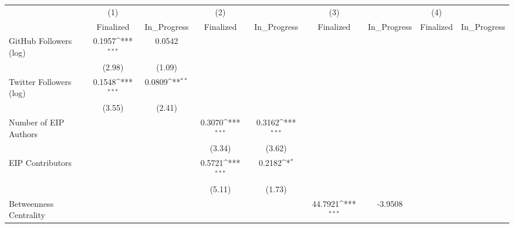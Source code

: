 {
\def\sym#1{\ifmmode^{#1}\else\(^{#1}\)\fi}
\begin{tabular}{l*{8}{c}}
\hline\hline
                                   &\multicolumn{1}{c}{(1)}         &                   &\multicolumn{1}{c}{(2)}         &                   &\multicolumn{1}{c}{(3)}         &                   &\multicolumn{1}{c}{(4)}         &                   \\
                                   & Finalized         &In\_Progress         & Finalized         &In\_Progress         & Finalized         &In\_Progress         & Finalized         &In\_Progress         \\
\hline
GitHub Followers (log)             &    0.1957\sym{***}&    0.0542         &                   &                   &                   &                   &                   &                   \\
                                   &    (2.98)         &    (1.09)         &                   &                   &                   &                   &                   &                   \\
[1em]
Twitter Followers (log)            &    0.1548\sym{***}&    0.0809\sym{**} &                   &                   &                   &                   &                   &                   \\
                                   &    (3.55)         &    (2.41)         &                   &                   &                   &                   &                   &                   \\
[1em]
Number of EIP Authors              &                   &                   &    0.3070\sym{***}&    0.3162\sym{***}&                   &                   &                   &                   \\
                                   &                   &                   &    (3.34)         &    (3.62)         &                   &                   &                   &                   \\
[1em]
EIP Contributors                   &                   &                   &    0.5721\sym{***}&    0.2182\sym{*}  &                   &                   &                   &                   \\
                                   &                   &                   &    (5.11)         &    (1.73)         &                   &                   &                   &                   \\
[1em]
Betweenness Centrality             &                   &                   &                   &                   &   44.7921\sym{***}&   -3.9508         &                   &                   \\

\end{tabular}}
